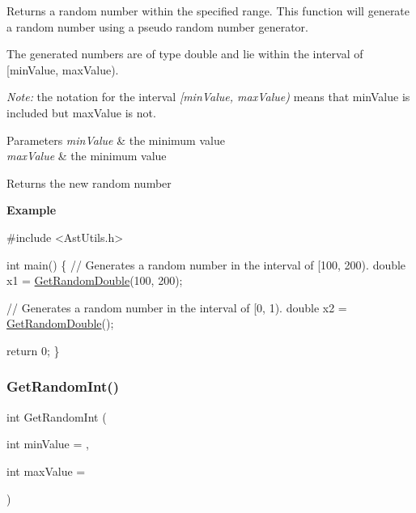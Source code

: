 Returns a random number within the specified range. This function will generate a random number using a pseudo random number generator.

The generated numbers are of type {\ttfamily double} and lie within the interval of \mbox{[}min\+Value, max\+Value).

{\itshape Note\+:} the notation for the interval {\itshape \mbox{[}min\+Value, max\+Value)} means that {\ttfamily min\+Value} is included but {\ttfamily max\+Value} is not.


\begin{DoxyParams}{Parameters}
{\em min\+Value} & the minimum value \\
\hline
{\em max\+Value} & the minimum value \\
\hline
\end{DoxyParams}
\begin{DoxyReturn}{Returns}
the new random number
\end{DoxyReturn}
{\bfseries Example}


\begin{DoxyCode}
\textcolor{preprocessor}{#include <AstUtils.h>}

\textcolor{keywordtype}{int} main()
\{
  \textcolor{comment}{// Generates a random number in the interval of [100, 200).}
  \textcolor{keywordtype}{double} x1 = \hyperlink{group__math__group_ga298f9ccec14d3ea06c05ccd1e1e062ac}{GetRandomDouble}(100, 200);

  \textcolor{comment}{// Generates a random number in the interval of [0, 1).}
  \textcolor{keywordtype}{double} x2 = \hyperlink{group__math__group_ga298f9ccec14d3ea06c05ccd1e1e062ac}{GetRandomDouble}();

  \textcolor{keywordflow}{return} 0;
\}
\end{DoxyCode}
 \mbox{\label{group__math__group_gab82c25b1da5feec79806fe080becf2c3}} 
\subsubsection{\texorpdfstring{Get\+Random\+Int()}{GetRandomInt()}}
{\footnotesize\ttfamily int Get\+Random\+Int (\begin{DoxyParamCaption}\item[{int}]{min\+Value = {},  }\item[{int}]{max\+Value = {} }\end{DoxyParamCaption})}

